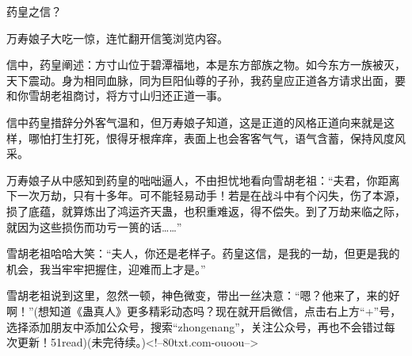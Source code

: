 \begin{this_body}
药皇之信？

万寿娘子大吃一惊，连忙翻开信笺浏览内容。

信中，药皇阐述：方寸山位于碧潭福地，本是东方部族之物。如今东方一族被灭，天下震动。身为相同血脉，同为巨阳仙尊的子孙，我药皇应正道各方请求出面，要和你雪胡老祖商讨，将方寸山归还正道一事。

信中药皇措辞分外客气温和，但万寿娘子知道，这是正道的风格正道向来就是这样，哪怕打生打死，恨得牙根痒痒，表面上也会客客气气，语气含蓄，保持风度风采。

万寿娘子从中感知到药皇的咄咄逼人，不由担忧地看向雪胡老祖：“夫君，你距离下一次万劫，只有十多年。可不能轻易动手！若是在战斗中有个闪失，伤了本源，损了底蕴，就算炼出了鸿运齐天蛊，也积重难返，得不偿失。到了万劫来临之际，就因为这些损伤而功亏一篑的话……”

雪胡老祖哈哈大笑：“夫人，你还是老样子。药皇这信，是我的一劫，但更是我的机会，我当牢牢把握住，迎难而上才是。”

雪胡老祖说到这里，忽然一顿，神色微变，带出一丝决意：“嗯？他来了，来的好啊！”(想知道《蛊真人》更多精彩动态吗？现在就开启微信，点击右上方“+”号，选择添加朋友中添加公众号，搜索“zhongenang”，关注公众号，再也不会错过每次更新！51read)(未完待续。)<!--80txt.com-ouoou-->

\end{this_body}

